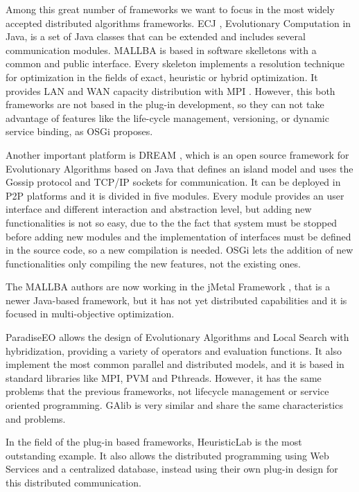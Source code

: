 \documentclass{sig-alternate}
\begin{document}
Among this great number of frameworks we want to focus in the most widely accepted distributed algorithms frameworks. ECJ \cite{ECJ}, Evolutionary Computation in Java, is a set of Java classes that can be extended and includes several communication modules. MALLBA \cite{MALLBA} is based in software skelletons with a common and public interface. Every skeleton implements a resolution technique for optimization in the fields of exact, heuristic or hybrid optimization. It provides LAN and WAN capacity distribution with MPI . However, this both frameworks are not based in the plug-in development, so they can not take advantage of features like the life-cycle management, versioning, or dynamic service binding, as OSGi proposes.

Another important platform is DREAM \cite{DREAM}, which is an open source framework for Evolutionary Algorithms based on Java that
defines an island model and uses the Gossip protocol and TCP/IP sockets for
communication. It can be deployed in P2P platforms and it is divided
in five modules. Every module provides an user interface and different
interaction and abstraction level, but adding new functionalities is not so easy, due to the the fact that system must be stopped before adding new modules and the implementation of interfaces must be defined in the source code, so a new compilation is needed. OSGi lets the addition of new functionalities only compiling the new features, not the existing ones. 

The MALLBA authors are now working in the jMetal Framework \cite{JMETAL}, that is a newer Java-based framework, but it has not yet distributed capabilities and it is focused in multi-objective optimization.

ParadiseEO \cite{PARADISEO} allows the design of Evolutionary Algorithms and Local Search with hybridization, providing a variety of operators and evaluation functions. It also implement the most common parallel and distributed models, and it is based in standard libraries like MPI, PVM and Pthreads. However, it has the same problems that the previous frameworks, not lifecycle management or service oriented programming. GAlib \cite{GALIB} is very similar and share the same characteristics and problems.

In the field of the plug-in based frameworks, HeuristicLab \cite{HEURISTICLAB} is the most outstanding example. It also allows the distributed programming using Web Services and a centralized database, instead using their own plug-in design for this distributed communication.
\end{document}
